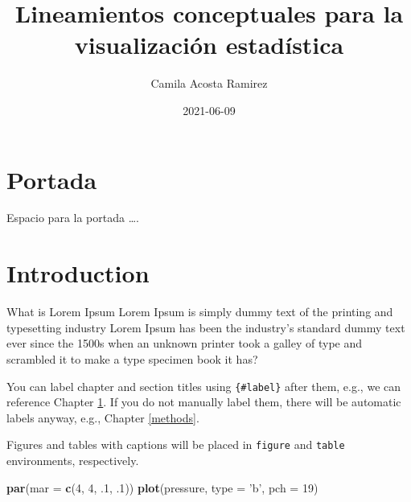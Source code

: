 \documentclass[
]{book}
\title{Lineamientos conceptuales para la visualización estadística}
\author{Camila Acosta Ramirez}
\date{2021-06-09}
\newenvironment{Shaded}{\begin{snugshade}}{\end{snugshade}}
\newcommand{\DataTypeTok}[1]{\textcolor[rgb]{0.13,0.29,0.53}{#1}}
\newcommand{\DecValTok}[1]{\textcolor[rgb]{0.00,0.00,0.81}{#1}}
\newcommand{\FloatTok}[1]{\textcolor[rgb]{0.00,0.00,0.81}{#1}}
\newcommand{\KeywordTok}[1]{\textcolor[rgb]{0.13,0.29,0.53}{\textbf{#1}}}
\newcommand{\NormalTok}[1]{#1}
\newcommand{\StringTok}[1]{\textcolor[rgb]{0.31,0.60,0.02}{#1}}
\begin{document}
\maketitle

{
\setcounter{tocdepth}{1}
\tableofcontents
}
\hypertarget{portada}{%
\chapter*{Portada}\label{portada}}

Espacio para la portada \ldots.

\hypertarget{intro}{%
\chapter{Introduction}\label{intro}}

What is Lorem Ipsum Lorem Ipsum is simply dummy text of the printing and typesetting industry Lorem Ipsum has been the industry's standard dummy text ever since the 1500s when an unknown printer took a galley of type and scrambled it to make a type specimen book it has?

You can label chapter and section titles using \texttt{\{\#label\}} after them, e.g., we can reference Chapter \ref{intro}. If you do not manually label them, there will be automatic labels anyway, e.g., Chapter \ref{methods}.

Figures and tables with captions will be placed in \texttt{figure} and \texttt{table} environments, respectively.

\begin{Shaded}
\begin{Highlighting}[]
\KeywordTok{par}\NormalTok{(}\DataTypeTok{mar =} \KeywordTok{c}\NormalTok{(}\DecValTok{4}\NormalTok{, }\DecValTok{4}\NormalTok{, }\FloatTok{.1}\NormalTok{, }\FloatTok{.1}\NormalTok{))}
\KeywordTok{plot}\NormalTok{(pressure, }\DataTypeTok{type =} \StringTok{'b'}\NormalTok{, }\DataTypeTok{pch =} \DecValTok{19}\NormalTok{)}
\end{Highlighting}
\end{Shaded}
\end{document}
